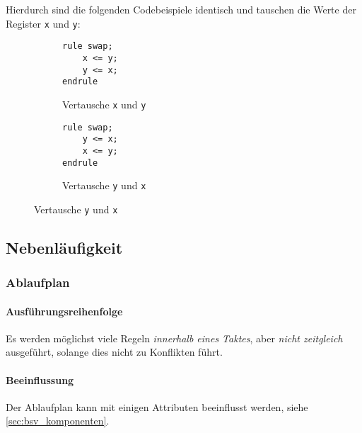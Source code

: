 			Hierdurch sind die folgenden Codebeispiele identisch und tauschen die Werte der Register \texttt{x} und \texttt{y}:
			\begin{figure}[ht]
				\centering
				\begin{subfigure}{0.4\textwidth}
					\begin{lstlisting}
rule swap;
	x <= y;
	y <= x;
endrule
					\end{lstlisting}
					\caption{Vertausche \texttt{x} und \texttt{y}}
				\end{subfigure}
				\begin{subfigure}{0.4\textwidth}
					\begin{lstlisting}
rule swap;
	y <= x;
	x <= y;
endrule
					\end{lstlisting}
					\caption{Vertausche \texttt{y} und \texttt{x}}
				\end{subfigure}
			\end{figure}
		
		\subsection{Nebenläufigkeit}
			\subsubsection{Ablaufplan}
				\paragraph{Ausführungsreihenfolge}
					Es werden möglichst viele Regeln \textit{innerhalb eines Taktes}, aber \textit{nicht zeitgleich} ausgeführt, solange dies nicht zu Konflikten führt.
				
				\paragraph{Beeinflussung}
					Der Ablaufplan kann mit einigen Attributen beeinflusst werden, siehe \ref{sec:bsv_komponenten}.
			
